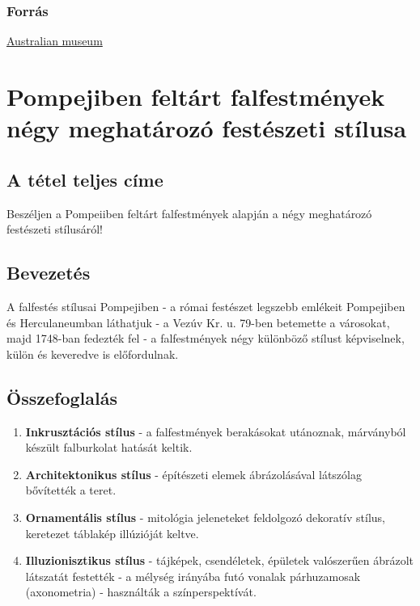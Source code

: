	\subsubsection{Forrás}
	
	\href{https://australian.museum/learn/cultures/international-collection/ancient-egyptian/the-painter-in-ancient-egypt/}{Australian museum}
\newpage

\section{Pompejiben feltárt falfestmények négy meghatározó festészeti stílusa }

	\subsection{A tétel teljes címe}
	
	Beszéljen a Pompeiiben feltárt falfestmények alapján a négy meghatározó festészeti stílusáról!
	
	\subsection{Bevezetés}
	
	A falfestés stílusai Pompejiben - a római festészet legszebb emlékeit Pompejiben és
	Herculaneumban láthatjuk - a Vezúv Kr. u. 79-ben betemette a városokat, majd 1748-ban
	fedezték fel - a falfestmények négy különböző stílust képviselnek, külön és keveredve is
	előfordulnak.
	
	\subsection{Összefoglalás}
	
	\begin{enumerate}
		\item  \textbf{Inkrusztációs stílus} - a falfestmények berakásokat utánoznak, márványból készült
		falburkolat hatását keltik.
		
		\item  \textbf{Architektonikus stílus} - építészeti elemek ábrázolásával látszólag bővítették a teret. 
		
		\item \textbf{ Ornamentális stílus} - mitológia jeleneteket feldolgozó dekoratív stílus, keretezet
		táblakép illúzióját keltve.
		
		\item\textbf{ Illuzionisztikus stílus} - tájképek, csendéletek, épületek valószerűen ábrázolt látszatát
		festették - a mélység irányába futó vonalak párhuzamosak (axonometria) - használták a
		színperspektívát.
	\end{enumerate} 

